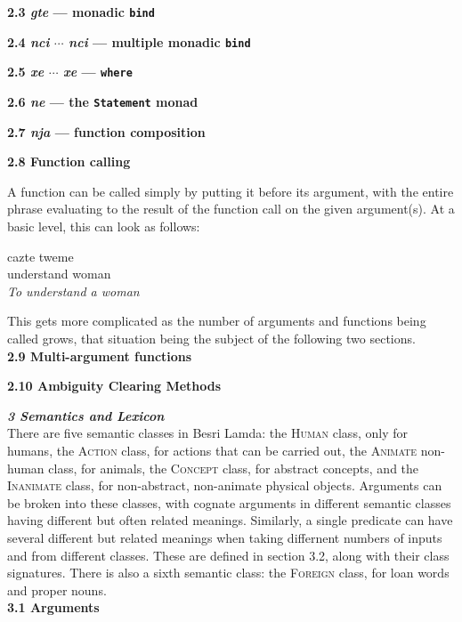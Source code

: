 \documentclass{article}[10pt]
\begin{document}
{\bf 2.3 \emph{gte} --- monadic \texttt{bind}}
 
{\bf 2.4 \emph{nci} $\cdots$ \emph{nci} --- multiple monadic \texttt{bind}}

{\bf 2.5 \emph{xe} $\cdots$ \emph{xe} --- \texttt{where}}

{\bf 2.6 \emph{ne} --- the \texttt{Statement} monad}

{\bf 2.7 \emph{nja} --- function composition}

{\bf 2.8 Function calling}

A function can be called simply by putting it before its argument, with the entire phrase evaluating to the result of the function call on the given argument(s). At a basic level, this can look as follows:

\begin{exe}
\ex
\gll cazte tweme\\
understand woman\\
\trans \emph{To understand a woman}
\end{exe}

This gets more complicated as the number of arguments and functions being called grows, that situation being the subject of the following two sections.\\

{\bf 2.9 Multi-argument functions}

{\bf 2.10 Ambiguity Clearing Methods}

\clearpage
{\bf \emph{3 Semantics and Lexicon}}\\

There are five semantic classes in Besri Lamda: the \textsc{Human} class, only for humans, the \textsc{Action} class, for actions that can be carried out, the \textsc{Animate} non-human class, for animals, the \textsc{Concept} class, for abstract concepts, and the \textsc{Inanimate} class, for non-abstract, non-animate physical objects. Arguments can be broken into these classes, with cognate arguments in different semantic classes having different but often related meanings. Similarly, a single predicate can have several different but related meanings when taking differnent numbers of inputs and from different classes. These are defined in section 3.2, along with their class signatures. There is also a sixth semantic class: the \textsc{Foreign} class, for loan words and proper nouns.\\

{\bf 3.1 Arguments}\\
\end{document}
